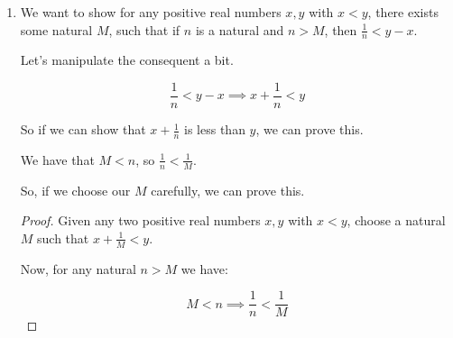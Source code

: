 \documentclass[12pt,letterpaper]{article}
\begin{document}
\begin{enumerate}
\begin{enumerate}
\begin{enumerate}
              It helps to manipulate the consequent a bit:

              \[
                40 > 10 - 2x > 12 \implies 30 > -2x > 2 \implies -15 < x < -1
              \]

              So if we have $L = -15, G = -1$, then we can work backwards to the proof.

              \begin{proof}
                Choose $L = -15, G = -1$.

                Then $L, G \in \mathbb{Z}$.

                Now, for any real number $x$.

                If $L < x < G$, then we have:

                \[
                  -15 < x < -1 \implies 30 > -2x > 2  \implies 40 > 10 - 2x > 12
                \]

                So we have shown that there exist integers $L, G$,
                such that for any real number $x$,
                if $L < x < G$, then $40 > 10 - 2x > 12$.
              \end{proof}
            \setcounter{enumiii}{13}
            \item

              We want to show for any positive real numbers $x, y$ with $x < y$,
              there exists some natural $M$,
              such that if $n$ is a natural and $n > M$, then $\frac{1}{n} < y - x$.

              Let's manipulate the consequent a bit.

              \[
                \frac{1}{n} < y - x \implies x + \frac{1}{n} < y
              \]

              So if we can show that $x + \frac{1}{n}$ is less than $y$, we can prove this.

              We have that $M < n$, so $\frac{1}{n} < \frac{1}{M}$.

              So, if we choose our $M$ carefully, we can prove this.

              \begin{proof}
                Given any two positive real numbers $x, y$ with $x < y$,
                choose a natural $M$ such that $x + \frac{1}{M} < y$.

                Now, for any natural $n > M$ we have:

                \[
                  M < n \implies \frac{1}{n} < \frac{1}{M}
                \]


\end{proof}
\end{enumerate}
\end{enumerate}
\end{enumerate}
\end{document}
